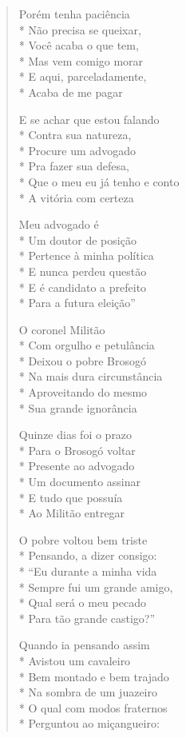 \begin{verse}
Porém tenha paciência\\*
Não precisa se queixar,\\*
Você acaba o que tem,\\*
Mas vem comigo morar\\*
E aqui, parceladamente,\\*
Acaba de me pagar

E se achar que estou falando\\*
Contra sua natureza,\\*
Procure um advogado\\*
Pra fazer sua defesa,\\*
Que o meu eu já tenho e conto\\*
A vitória com certeza

Meu advogado é\\*
Um doutor de posição\\*
Pertence à minha política\\*
E nunca perdeu questão\\*
E é candidato a prefeito\\*
Para a futura eleição''

O coronel Militão\\*
Com orgulho e petulância\\*
Deixou o pobre Brosogó\\*
Na mais dura circunstância\\*
Aproveitando do mesmo\\*
Sua grande ignorância

Quinze dias foi o prazo\\*
Para o Brosogó voltar\\*
Presente ao advogado\\*
Um documento assinar\\*
E tudo que possuía\\*
Ao Militão entregar

O pobre voltou bem triste\\*
Pensando, a dizer consigo:\\*
``Eu durante a minha vida\\*
Sempre fui um grande amigo,\\*
Qual será o meu pecado\\*
Para tão grande castigo?''

Quando ia pensando assim\\*
Avistou um cavaleiro\\*
Bem montado e bem trajado\\*
Na sombra de um juazeiro\\*
O qual com modos fraternos\\*
Perguntou ao miçangueiro:


\end{verse}
